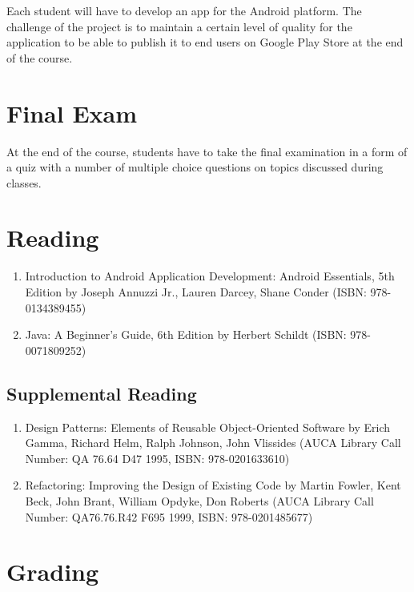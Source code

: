 \documentclass[12pt,a4paper,oneside]{article}
\begin{document}
        Each student will have to develop an app for the Android platform. The
        challenge of the project is to maintain a certain level of quality for
        the application to be able to publish it to end users on Google Play
        Store at the end of the course.

    \section{Final Exam}

        At the end of the course, students have to take the final examination in
        a form of a quiz with a number of multiple choice questions on topics
        discussed during classes.

    \section{Reading}

        \begin{enumerate}
            \item Introduction to Android Application Development: Android
            Essentials, 5th Edition by Joseph Annuzzi Jr., Lauren Darcey, Shane
            Conder (ISBN: 978-0134389455)
            \item Java: A Beginner's Guide, 6th Edition by Herbert Schildt
            (ISBN: 978-0071809252)
        \end{enumerate}

        \subsection{Supplemental Reading}

            \begin{enumerate}
                \item Design Patterns: Elements of Reusable Object-Oriented
                Software by Erich Gamma, Richard Helm, Ralph Johnson, John
                Vlissides (AUCA Library Call Number: QA 76.64 D47 1995, ISBN:
                978-0201633610)
                \item Refactoring: Improving the Design of Existing Code by
                Martin Fowler, Kent Beck, John Brant, William Opdyke, Don
                Roberts (AUCA Library Call Number: QA76.76.R42 F695 1999, ISBN:
                978-0201485677)
            \end{enumerate}

    \section{Grading}
\end{document}
